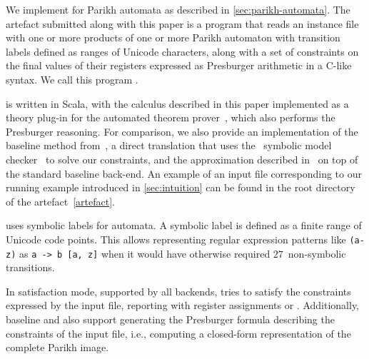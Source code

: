 
We implement \Calculus{} for Parikh automata as described in
\cref{sec:parikh-automata}. The artefact submitted along with this paper is a
program that reads an instance file with one or more products of one or more
Parikh automaton with transition labels defined as ranges of Unicode characters,
along with a set of constraints on the final values of their registers expressed
as Presburger arithmetic in a C-like syntax. We call this program
\Catra.

\Catra{} is written in Scala, with the calculus described in this paper
implemented as a theory plug-in for the \Princess{} automated theorem
prover~\cite{princess}, which also performs the Presburger reasoning. For
comparison, we also provide an implementation of the baseline method
from~\cite{generate-parikh-image}, a direct translation that uses the~\Nuxmv{}
symbolic model checker~\cite{nuxmv} to solve our constraints, and the
approximation described in~\cite{approximate-parikh} on top of the standard
baseline back-end. An example of an input file corresponding to our running
example introduced in \cref{sec:intuition} can be found in the root directory
of the artefact~\cref{artefact}.

\Catra{} uses symbolic labels for automata. A symbolic label is defined as a
finite range of Unicode code points. This allows representing regular expression
patterns like \lstinline{(a-z)} as \lstinline{a -> b [a, z]} when it would have
otherwise required $27$~non-symbolic transitions. 

In satisfaction mode, supported by all backends, \Catra{} tries to satisfy the
constraints expressed by the input file, reporting \Sat{} with register
assignments or \Unsat{}. Additionally, baseline and \Calculus{} also support
generating the Presburger formula describing the constraints of the input file,
i.e., computing a closed-form representation of the complete Parikh image.


